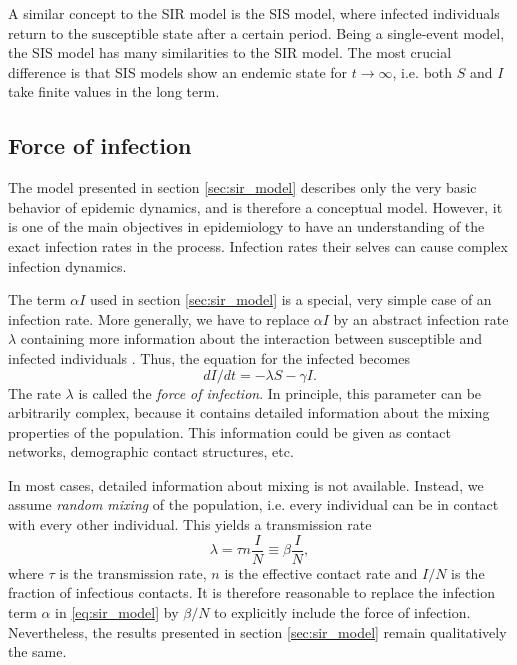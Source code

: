 \documentclass[openright,twoside,headsepline]{scrbook}
\begin{document}
A similar concept to the SIR model is the SIS model, where infected individuals return to the susceptible state after a certain period.
Being a single-event model, the SIS model has many similarities to the SIR model.
The most crucial difference is that SIS models show an endemic state for $t\rightarrow \infty $, i.e. both $S$ and $I$ take finite values in the long term.

\subsection{Force of infection}\label{sec:force_of_infection}
The model presented in section \ref{sec:sir_model} describes only the very basic behavior of epidemic dynamics, and is therefore a conceptual model.
However, it is one of the main objectives in epidemiology to have an understanding of the exact infection rates in the process.
Infection rates their selves can cause complex infection dynamics.

The term $\alpha I$ used in section \ref{sec:sir_model} is a special, very simple case of an infection rate.
More generally, we have to replace $\alpha I$ by an abstract infection rate $\lambda $ containing more information about the interaction between susceptible and infected individuals \citep{Keeling:2005}.
Thus, the equation for the infected becomes
\[
dI/dt = -\lambda S -\gamma I.
\]
The rate $\lambda $ is called the \emph{force of infection}.
In principle, this parameter can be arbitrarily complex, because it contains detailed information about the mixing properties of the population.
This information could be given as contact networks, demographic contact structures, etc.

In most cases, detailed information about mixing is not available.
Instead, we assume \emph{random mixing} of the population, i.e. every individual can be in contact with every other individual.
This yields a transmission rate \citep{Keeling:2005}
\begin{equation}\label{eq:force_of_infection}
\lambda = \tau n \frac{I}{N}\equiv \beta \frac{I}{N},
\end{equation}
where $\tau $ is the transmission rate, $n$ is the effective contact rate and $I/N$ is the fraction of infectious contacts.
It is therefore reasonable to replace the infection term $\alpha $ in \eqref{eq:sir_model} by $\beta /N$ to explicitly include the force of infection.
Nevertheless, the results presented in section \ref{sec:sir_model} remain qualitatively the same.
\end{document}
